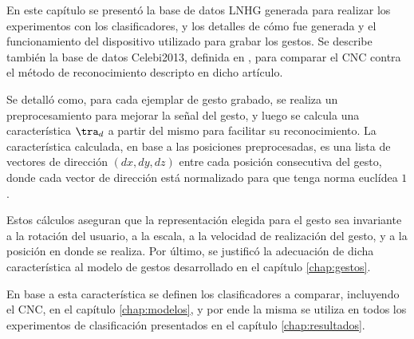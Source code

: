 En este capítulo se presentó la base de datos LNHG generada para realizar los experimentos con los clasificadores, y los detalles de cómo fue generada y el funcionamiento del dispositivo utilizado para grabar los gestos. Se describe también la base de datos Celebi2013, definida en \cite{celebi2013}, para comparar el CNC contra el método de reconocimiento descripto en dicho artículo.

Se detalló como, para cada ejemplar de gesto grabado, se realiza un preprocesamiento para mejorar la señal del gesto, y luego se calcula una característica $\tra_d$ a partir del mismo para facilitar su reconocimiento. La característica calculada, en base a las posiciones preprocesadas, es una lista de vectores de dirección $(dx,dy,dz)$ entre cada posición consecutiva del gesto, donde cada vector de dirección está normalizado para que tenga norma euclídea $1$. 

Estos cálculos aseguran que la representación elegida para el gesto sea invariante a la rotación del usuario, a la escala, a la velocidad de realización del gesto, y a la posición en donde se realiza. Por último, se justificó la adecuación de dicha característica al modelo de gestos desarrollado en el capítulo \ref{chap:gestos}.

En base a esta característica se definen los clasificadores a comparar, incluyendo el CNC, en el capítulo \ref{chap:modelos}, y por ende la misma se utiliza en todos los experimentos de clasificación presentados en el capítulo \ref{chap:resultados}.



%


